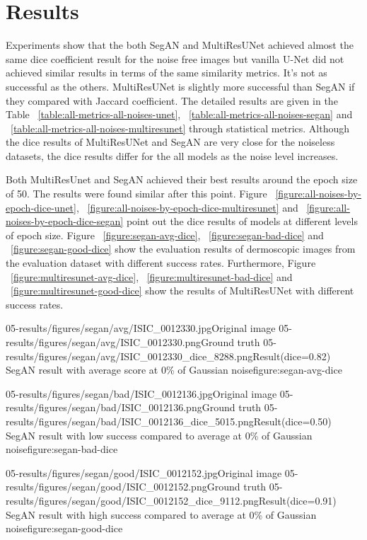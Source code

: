 \chapter{Results}

    Experiments show that the both SegAN and MultiResUNet achieved almost the same dice coefficient result for the noise free images
    but vanilla U-Net did not achieved similar results in terms of the same similarity metrics. It's not as successful as the others.
    MultiResUNet is slightly more successful than SegAN if they compared with Jaccard coefficient.
    The detailed results are given in the Table ~\ref{table:all-metrics-all-noises-unet}, ~\ref{table:all-metrics-all-noises-segan} and ~\ref{table:all-metrics-all-noises-multiresunet} through statistical metrics.
    Although the dice results of MultiResUNet and SegAN are very close for the noiseless datasets, the dice results differ for the all models as the noise level increases.

    Both MultiResUnet and SegAN achieved their best results around the epoch size of 50. The results were found similar after this point.
    Figure ~\ref{figure:all-noises-by-epoch-dice-unet}, ~\ref{figure:all-noises-by-epoch-dice-multiresunet} and ~\ref{figure:all-noises-by-epoch-dice-segan} point out the dice results of models at different levels of epoch size.
    Figure ~\ref{figure:segan-avg-dice}, ~\ref{figure:segan-bad-dice} and ~\ref{figure:segan-good-dice} show the evaluation results of dermoscopic images from the evaluation dataset with different success rates.
    Furthermore, Figure ~\ref{figure:multiresunet-avg-dice}, ~\ref{figure:multiresunet-bad-dice} and ~\ref{figure:multiresunet-good-dice} show the results of MultiResUNet with different success rates.

    \sidebyside
        {05-results/figures/segan/avg/ISIC_0012330.jpg}{Original image}
        {05-results/figures/segan/avg/ISIC_0012330.png}{Ground truth}
        {05-results/figures/segan/avg/ISIC_0012330_dice_8288.png}{Result(dice=0.82)}
        {SegAN result with average score at 0\% of Gaussian noise}{figure:segan-avg-dice}

    \sidebyside
        {05-results/figures/segan/bad/ISIC_0012136.jpg}{Original image}
        {05-results/figures/segan/bad/ISIC_0012136.png}{Ground truth}
        {05-results/figures/segan/bad/ISIC_0012136_dice_5015.png}{Result(dice=0.50)}
        {SegAN result with low success compared to average at 0\% of Gaussian noise}{figure:segan-bad-dice}

    \sidebyside
        {05-results/figures/segan/good/ISIC_0012152.jpg}{Original image}
        {05-results/figures/segan/good/ISIC_0012152.png}{Ground truth}
        {05-results/figures/segan/good/ISIC_0012152_dice_9112.png}{Result(dice=0.91)}
        {SegAN result with high success compared to average at 0\% of Gaussian noise}{figure:segan-good-dice}

